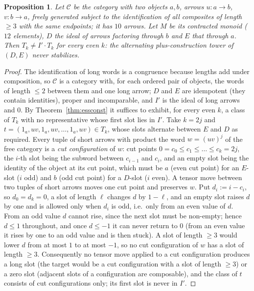 \documentclass[11pt]{amsart}
\newtheorem{prop}[thm]{Proposition}
\theoremstyle{definition}
\begin{document}
\begin{prop}\label{prop:cyclic}
Let $\mathcal C$ be the category with two objects $a,b$, arrows $u\colon a\to b$,
$v\colon b\to a$, freely generated subject to the identification of all
composites of length $\ge3$ with the same endpoints; it has $10$ arrows. Let
$M$ be its contracted monoid ($12$ elements), $D$ the ideal of arrows factoring
through $b$ and $E$ that through $a$. Then $T_k\ne I'\cdot T_k$ for every even
$k$: the alternating plus-construction tower of $(D,E)$ never stabilizes.
\end{prop}
\begin{proof}
The identification of long words is a congruence because lengths add under
composition, so $\mathcal C$ is a category with, for each ordered pair of
objects, the words of length $\le2$ between them and one long arrow; $D$ and $E$
are idempotent (they contain identities), proper and incomparable, and
$I'$ is the ideal of long arrows and $0$. By Theorem~\ref{thm:essconst} it
suffices to exhibit, for every even $k$, a class of $T_k$ with no representative
whose first slot lies in $I'$. Take $k=2j$ and
$t=(1_a,uv,1_a,uv,\dots,1_a,uv)\in T_k$, whose slots alternate between $E$ and
$D$ as required. Every tuple of short arrows with product the word $w=(uv)^j$ of
the free category is a \emph{cut configuration} of $w$: cut points
$0=c_0\le c_1\le\dots\le c_k=2j$, the $i$-th slot being the subword between
$c_{i-1}$ and $c_i$, and an empty slot being the identity of the object at its
cut point, which must be $a$ (even cut point) for an $E$-slot ($i$ odd) and $b$
(odd cut point) for a $D$-slot ($i$ even). A tensor move between two tuples of
short arrows moves one cut point and preserves $w$. Put $d_i:=i-c_i$, so
$d_0=d_k=0$, a slot of length $\ell$ changes $d$ by $1-\ell$, and an empty slot
raises $d$ by one and is allowed only when $d_i$ is odd, i.e.\ only from an even
value of $d$. From an odd value $d$ cannot rise, since the next slot must be
non-empty; hence $d\le1$ throughout, and once $d\le-1$ it can never return to
$0$ (from an even value it rises by one to an odd value and is then stuck).
A slot of length $\ge3$ would lower $d$ from at most $1$ to at most $-1$, so no
cut configuration of $w$ has a slot of length $\ge3$. Consequently no tensor
move applied to a cut configuration produces a long slot (the target would be a
cut configuration with a slot of length $\ge3$) or a zero slot (adjacent slots
of a configuration are composable), and the class of $t$ consists of cut
configurations only; its first slot is never in $I'$.
\end{proof}
\end{document}
